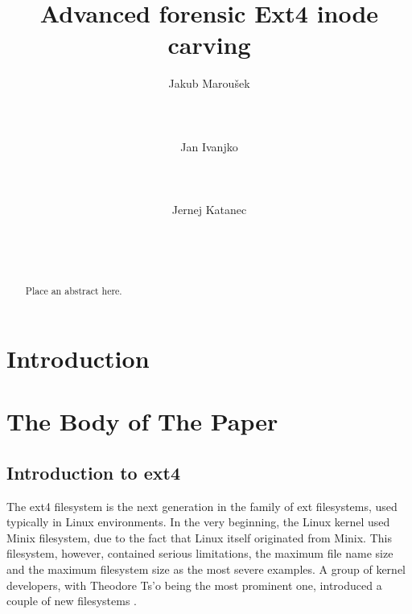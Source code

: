 \documentclass{acm_proc_article-sp}
\begin{document}
\title{Advanced forensic Ext4 inode carving}

\author{
\alignauthor Jakub Marou\v sek \\
	\\
    \\
    \\
\alignauthor Jan Ivanjko \\
	\\
    \\
    \\
\alignauthor Jernej Katanec \\
	\\
    \\
    \\
}

\maketitle
\begin{abstract}
Place an abstract here.
\end{abstract}

\section{Introduction}

\cite{braams:babel}

\section{The {\secit Body} of The Paper}

\subsection{Introduction to ext4}

The ext4 filesystem is the next generation in the family of ext filesystems, used typically in Linux environments. In the very beginning, the Linux kernel used Minix filesystem, due to the fact that Linux itself originated from Minix. This filesystem, however, contained serious limitations, the maximum file name size and the maximum filesystem size as the most severe examples. A group of kernel developers, with Theodore Ts'o being the most prominent one, introduced a couple of new filesystems \cite{ext2design}.
\end{document}

